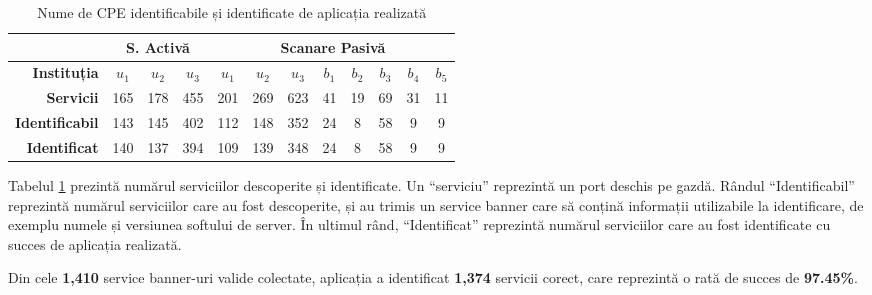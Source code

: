 	\begin{table}[H]
		\centering
		\begin{tabular}{r|ccc|ccc|ccccc|}
			\cline{2-12}
			\multicolumn{1}{l|}{}                         & \multicolumn{3}{c|}{\textbf{S. Activă}} & \multicolumn{8}{c|}{\textbf{Scanare Pasivă}}                                                             \\ \hline
			\multicolumn{1}{|r|}{\textbf{Instituția}}      & \textbf{$u_1$}    & \textbf{$u_2$}    & \textbf{$u_3$}   & \textbf{$u_1$} & \textbf{$u_2$} & \textbf{$u_3$} & \textbf{$b_1$} & \textbf{$b_2$} & \textbf{$b_3$} & \textbf{$b_4$} & \textbf{$b_5$} \\ \hline
			\multicolumn{1}{|r|}{\textbf{Servicii}} & 165            & 178            & 455           & 201         & 269         & 623         & 41          & 19          & 69          & 31          & 11          \\
			\multicolumn{1}{|r|}{\textbf{Identificabil}} & 143            & 145            & 402           & 112         & 148         & 352         & 24          & 8           & 58          & 9           & 9           \\
			\multicolumn{1}{|r|}{\textbf{Identificat}}   & 140            & 137            & 394           & 109         & 139         & 348         & 24          & 8           & 58          & 9           & 9           \\ \hline
		\end{tabular}
		\caption{Nume de CPE identificabile și identificate de aplicația realizată}
		\label{cpeids_ro}
	\end{table}
	
	Tabelul \ref{cpeids_ro} prezintă numărul serviciilor descoperite și identificate. Un ``serviciu'' reprezintă un port deschis pe gazdă. Rândul ``Identificabil'' reprezintă numărul serviciilor care au fost descoperite, și au trimis un service banner care să conțină informații utilizabile la identificare, de exemplu numele și versiunea softului de server. În ultimul rând, ``Identificat'' reprezintă numărul serviciilor care au fost identificate cu succes de aplicația realizată.
	
	Din cele \textbf{1,410} service banner-uri valide colectate, aplicația a identificat \textbf{1,374} servicii corect, care reprezintă o rată de succes de \textbf{97.45\%}.
	
